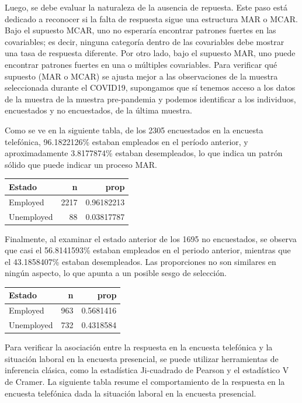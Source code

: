 \documentclass[
  12pt,
  spanish,
]{book}
\begin{document}
Luego, se debe evaluar la naturaleza de la ausencia de repuesta. Este paso está dedicado a reconocer si la falta de respuesta sigue una estructura MAR o MCAR. Bajo el supuesto MCAR, uno no esperaría encontrar patrones fuertes en las covariables; es decir, ninguna categoría dentro de las covariables debe mostrar una tasa de respuesta diferente. Por otro lado, bajo el supuesto MAR, uno puede encontrar patrones fuertes en una o múltiples covariables. Para verificar qué supuesto (MAR o MCAR) se ajusta mejor a las observaciones de la muestra seleccionada durante el COVID19, supongamos que sí tenemos acceso a los datos de la muestra de la muestra pre-pandemia y podemos identificar a los individuos, encuestados y no encuestados, de la última muestra.

Como se ve en la siguiente tabla, de los 2305 encuestados en la encuesta telefónica, 96.1822126\% estaban empleados en el período anterior, y aproximadamente 3.8177874\% estaban desempleados, lo que indica un patrón sólido que puede indicar un proceso MAR.

\captionsetup[table]{labelformat=empty,skip=1pt}
\begin{longtable}{lrr}
\toprule
Estado & n & prop \\ 
\midrule
Employed & 2217 & 0.96182213 \\ 
Unemployed & 88 & 0.03817787 \\ 
 \bottomrule
\end{longtable}

Finalmente, al examinar el estado anterior de los 1695 no encuestados, se observa que casi el 56.8141593\% estaban empleados en el periodo anterior, mientras que el 43.1858407\% estaban desempleados. Las proporciones no son similares en ningún aspecto, lo que apunta a un posible sesgo de selección.

\captionsetup[table]{labelformat=empty,skip=1pt}
\begin{longtable}{lrr}
\toprule
Estado & n & prop \\ 
\midrule
Employed & 963 & 0.5681416 \\ 
Unemployed & 732 & 0.4318584 \\ 
 \bottomrule
\end{longtable}

Para verificar la asociación entre la respuesta en la encuesta telefónica y la situación laboral en la encuesta presencial, se puede utilizar herramientas de inferencia clásica, como la estadística Ji-cuadrado de Pearson y el estadístico V de Cramer. La siguiente tabla resume el comportamiento de la respuesta en la encuesta telefónica dada la situación laboral en la encuesta presencial.
\end{document}
